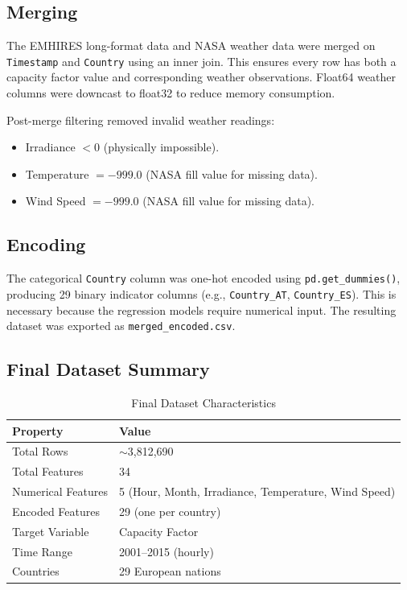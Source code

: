 \documentclass[12pt, a4paper]{article}
\begin{document}
\subsection{Merging}

The EMHIRES long-format data and NASA weather data were merged on \texttt{Timestamp} and \texttt{Country} using an inner join. This ensures every row has both a capacity factor value and corresponding weather observations. Float64 weather columns were downcast to float32 to reduce memory consumption.

Post-merge filtering removed invalid weather readings:
\begin{itemize}[noitemsep]
    \item Irradiance $< 0$ (physically impossible).
    \item Temperature $= -999.0$ (NASA fill value for missing data).
    \item Wind Speed $= -999.0$ (NASA fill value for missing data).
\end{itemize}

\subsection{Encoding}

The categorical \texttt{Country} column was one-hot encoded using \texttt{pd.get\_dummies()}, producing 29 binary indicator columns (e.g., \texttt{Country\_AT}, \texttt{Country\_ES}). This is necessary because the regression models require numerical input. The resulting dataset was exported as \texttt{merged\_encoded.csv}.

\subsection{Final Dataset Summary}

\begin{table}[H]
    \centering
    \caption{Final Dataset Characteristics}
    \begin{tabular}{ll}
        \toprule
        \textbf{Property} & \textbf{Value} \\
        \midrule
        Total Rows & $\sim$3,812,690 \\
        Total Features & 34 \\
        Numerical Features & 5 (Hour, Month, Irradiance, Temperature, Wind Speed) \\
        Encoded Features & 29 (one per country) \\
        Target Variable & Capacity Factor \\
        Time Range & 2001--2015 (hourly) \\
        Countries & 29 European nations \\
        \bottomrule
    \end{tabular}
\end{table}
\end{document}
